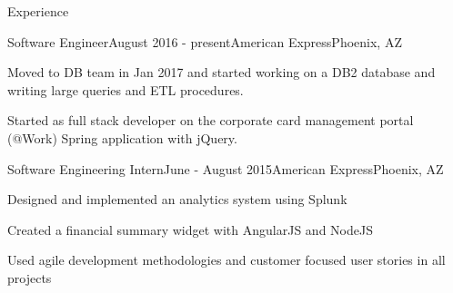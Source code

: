 \documentclass{resume} %
\begin{document}
\begin{rSection}{Experience}

\begin{rSubsection}{Software Engineer}{August 2016 - present}{American Express}{Phoenix, AZ}
\item Moved to DB team in Jan 2017 and started working on a DB2 database and writing large queries and ETL procedures.
\item Started as full stack developer on the corporate card management portal (@Work) Spring application with jQuery. 

\end{rSubsection}
\begin{rSubsection}{Software Engineering Intern}{June - August 2015}{American Express}{Phoenix, AZ}
\item Designed and implemented an analytics system using Splunk 
\item Created a financial summary widget with AngularJS and NodeJS
\item Used agile development methodologies and customer focused user stories in all projects
\end{rSubsection}






\end{rSection}
\end{document}
